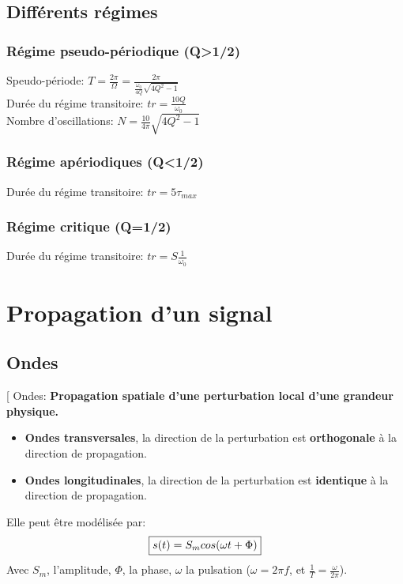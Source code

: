 \documentclass[12pt,hidelinks]{article}
\begin{document}
    \subsection{Différents régimes}
    \subsubsection{Régime pseudo-périodique (Q>1/2)}
    Speudo-période: $T=\frac{2 \pi}{\Omega}=\frac{2 \pi}{\frac{\omega_0}{4Q}\sqrt{4Q^2-1}}$ \\ 
    Durée du régime transitoire: $tr=\frac{10Q}{\omega_0}$ \\
    Nombre d'oscillations: $N=\frac{10}{4 \pi}\sqrt{4Q^2-1}$

    \subsubsection{Régime apériodiques (Q<1/2)}
    Durée du régime transitoire: $tr=5\tau_{max}$

    \subsubsection{Régime critique (Q=1/2)}
    Durée du régime transitoire: $tr=S\frac{1}{\omega_0}$
\newpage
\section{Propagation d'un signal}
\vspace{3cm}
	\subsection{Ondes}
    \begin{DashedDefinition}{}[
    Ondes: \textbf{Propagation spatiale d'une perturbation local d'une grandeur physique.}
    \begin{itemize}
        \item \textbf{Ondes transversales}, la direction de la perturbation est \textbf{orthogonale} à la direction de propagation. 
        \item \textbf{Ondes longitudinales}, la direction de la perturbation est \textbf{identique} à la direction de propagation. 
    \end{itemize}
    Elle peut être modélisée par:
    \[\fbox{$s(t)=S_m cos(\omega t + \Phi)$}\]
    Avec $S_m$, l'amplitude, $\Phi$, la phase, $\omega$ la pulsation ($\omega=2\pi f$, et $\frac{1}{T}=\frac{\omega}{2 \pi}$).
    \end{DashedDefinition}
\end{document}
